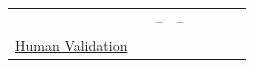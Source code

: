 \documentclass[smallextended]{svjour3}
\newcommand{\must}{\textbf{must}\xspace}
\newcommand{\should}{\textbf{should}\xspace}
\newcommand{\iconM}{\usebox{\iconMbox}\xspace}
\newcommand{\iconS}{\usebox{\iconSbox}\xspace}
\newcommand{\iconM}{●\xspace}
\newcommand{\iconS}{○\xspace}
\newcommand{\annotators}{\hyperref[sec:llms-as-annotators]{\mbox{\emph{LLMs as Annotators}}}\xspace}
\newcommand{\judges}{\hyperref[sec:llms-as-judges]{\mbox{\emph{LLMs as Judges}}}\xspace}
\newcommand{\synthesis}{\hyperref[sec:llms-for-synthesis]{\mbox{\emph{LLMs for Synthesis}}}\xspace}
\newcommand{\subjects}{\hyperref[sec:llms-as-subjects]{\mbox{\emph{LLMs as Subjects}}}\xspace}
\newcommand{\llmusage}{\hyperref[sec:studying-llm-usage-in-software-engineering]{\mbox{\emph{Studying LLM Usage}}}\xspace}
\newcommand{\benchmarkingtasks}{\hyperref[sec:benchmarking-llms-for-software-engineering-tasks]{\mbox{\emph{Benchmarking LLMs}}}\xspace}
\newcommand{\annotators}{\href{/study-types/annotators/}{\emph{LLMs as Annotators}}\xspace}
\newcommand{\judges}{\href{/study-types/judges/}{\emph{LLMs as Judges}}\xspace}
\newcommand{\synthesis}{\href{/study-types/synthesis/}{\emph{LLMs for Synthesis}}\xspace}
\newcommand{\subjects}{\href{/study-types/subjects/}{\emph{LLMs as Subjects}}\xspace}
\newcommand{\llmusage}{\href{/study-types/usage/}{\emph{Studying LLM Usage}}\xspace}
\newcommand{\benchmarkingtasks}{\href{/study-types/benchmarking/}{\emph{Benchmarking LLMs}}\xspace}
\begin{document}
\begin{appendices}
\begin{center}
\begin{tabular}{@{} l c c c c c c c @{}}
  & \iconS %
  & --     %
  & --     %
  & \iconS %
  & \iconS %
  \\
\hyperref[sec:use-human-validation-for-llm-outputs]{Human Validation}
  & \iconS %
  & \iconS %
  & \iconS %
  & \iconS %
  & \iconS %

\end{tabular}
\end{center}
\end{appendices}
\end{document}
